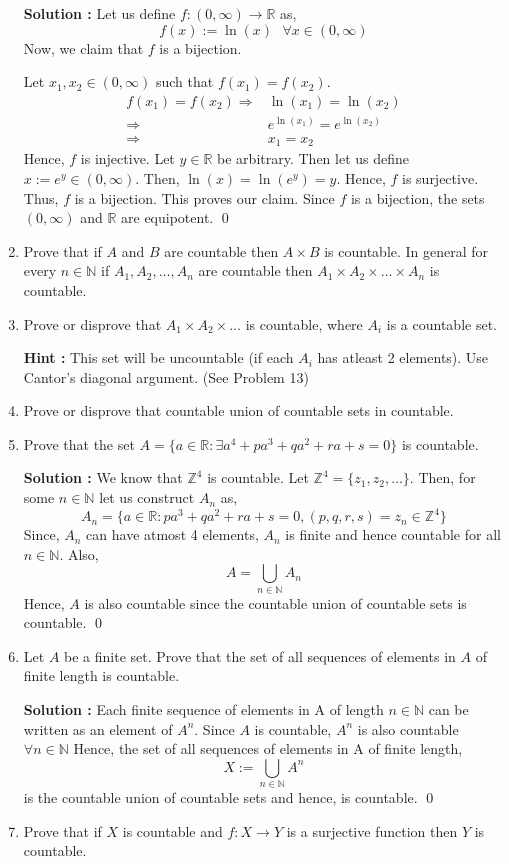 \documentclass[10pt]{article}
\newcommand{\nn}{\mathbb{N}}
\newcommand{\rn}{\mathbb{R}}
\newcommand{\z}{\mathbb{Z}}
\begin{document}
\begin{enumerate}
    \textbf{Solution : }Let us define $f : (0, \infty) \to \rn$ as, $$f(x) := \ln(x) \,\,\,\, \forall x \in (0, \infty)$$ Now, we claim that $f$ is a bijection. 

    Let $x_1, x_2 \in (0, \infty)$ such that $f(x_1) = f(x_2)$. 
    \begin{align*}
        f(x_1) = f(x_2)
        \Rightarrow &\ln(x_1) = \ln(x_2) \\
        \Rightarrow &e^{\ln(x_1)} = e^{\ln(x_2)} \\
        \Rightarrow &x_1 = x_2
    \end{align*}
    Hence, $f$ is injective. Let $y \in \rn$ be arbitrary. Then let us define $x := e^y \in (0, \infty)$. Then, $\ln(x) = \ln(e^y) = y$. Hence, $f$ is surjective. Thus, $f$ is a bijection. This proves our claim. Since $f$ is a bijection, the sets $(0, \infty)$ and $\rn$ are equipotent. \qed
    \item Prove that if $A$ and $B$ are countable then $A \times B$ is countable. In general for every $n \in \nn$ if $A_1, A_2, \dots , A_n$ are countable then $A_1 \times A_2 \times \dots \times A_n$ is countable.
    \item Prove or disprove that $A_1 \times A_2 \times \dots$ is countable, where $A_i$ is a countable set.

	    \textbf{Hint : }This set will be uncountable (if each $A_i$ has atleast 2  elements). Use Cantor's diagonal argument. (See Problem 13) 
    \item Prove or disprove that countable union of countable sets in countable.
    \item Prove that the set $A = \{ a \in \rn : \exists a^4 + pa^3 + qa^2 + ra + s = 0 \}$ is countable.
    
    \textbf{Solution : }We know that $\z^4$ is countable. Let $\z^4 = \{z_1, z_2, \dots \}$. Then, for some $n \in \nn$ let us construct $A_n$ as, $$A_n = \{a \in \rn : pa^3 + qa^2 + ra + s = 0, (p,q,r,s) = z_n \in \z^4 \}$$ Since, $A_n$ can have atmost 4 elements, $A_n$ is finite and hence countable for all $n \in \nn$. Also, $$A = \bigcup_{n\in\nn} A_n$$ Hence, $A$ is also countable since the countable union of countable sets is countable. \qed
    \item Let $A$ be a finite set. Prove that the set of all sequences of elements in $A$ of finite length is countable.

	    \textbf{Solution : }Each finite sequence of elements in A of length $n \in \nn$ can be written as 
	    an element of $A^n$. Since $A$ is countable, $A^n$ is also countable $\forall n\in \nn$
	    Hence, the set of all sequences of elements in A of finite length, 
	    $$ X:=\bigcup_{n \in \nn} A^n$$ is the countable union of countable sets and hence, is countable. \qed
    \item Prove that if $X$ is countable and $f : X \to Y$ is a surjective function then $Y$ is countable.


\end{enumerate}
\end{document}
